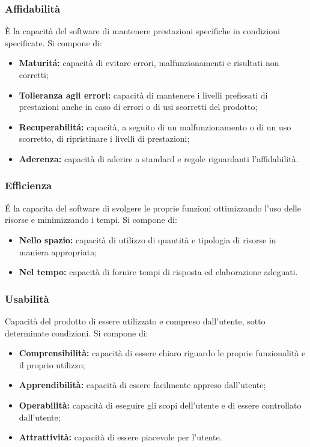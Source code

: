 \subsubsection{Affidabilit\`a}
\`E la capacit\`a del software di mantenere prestazioni specifiche in condizioni specificate.
Si compone di:
\begin{itemize}
    \item \textbf{Maturit\'a: }capacit\`a di evitare errori, malfunzionamenti e risultati non corretti;
    \item \textbf{Tolleranza agli errori: }capacit\`a di mantenere i livelli prefissati di prestazioni anche in caso di errori o di usi scorretti del prodotto;
    \item \textbf{Recuperabilit\'a: }capacit\`a, a seguito di un malfunzionamento o di un uso scorretto, di ripristinare i livelli di prestazioni;
    \item \textbf{Aderenza: }capacit\`a di aderire a standard e regole riguardanti l'affidabilit\`a.
\end{itemize}
\subsubsection{Efficienza}
\'E la capacita del software di svolgere le proprie funzioni ottimizzando l'uso delle risorse e minimizzando i tempi. Si compone di:
\begin{itemize}
    \item  \textbf{Nello spazio: }capacit\`a di utilizzo di quantit\`a e tipologia di risorse in maniera appropriata;
    \item  \textbf{Nel tempo: }capacit\`a di fornire tempi di risposta ed elaborazione adeguati.
\end{itemize}
\subsubsection{Usabilit\`a}
Capacit\`a del prodotto di essere utilizzato e compreso dall'utente, sotto determinate condizioni. Si compone di:
\begin{itemize}
    \item \textbf{Comprensibilit\`a: }capacit\`a di essere chiaro riguardo le proprie funzionalit\`a e il proprio utilizzo;
    \item \textbf{Apprendibilit\`a: }capacit\`a di essere facilmente appreso dall'utente;
    \item \textbf{Operabilit\`a: }capacit\`a di eseguire gli scopi dell'utente e di essere controllato dall'utente;
    \item \textbf{Attrattivit\`a: }capacit\`a di essere piacevole per l'utente.
\end{itemize}
